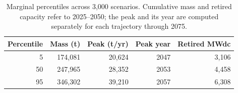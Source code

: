 \begin{table}[htbp]\centering\small
\caption{Marginal percentiles across 3,000 scenarios. Cumulative mass and retired capacity refer to 2025--2050; the peak and its year are computed separately for each trajectory through 2075.}\label{tab:mc}
\begin{tabular}{rrrrr}\toprule
Percentile & Mass (t) & Peak (t/yr) & Peak year & Retired MWdc \\
\midrule
5 & 174,081 & 20,624 & 2047 & 3,106 \\
50 & 247,965 & 28,352 & 2053 & 4,458 \\
95 & 346,302 & 39,210 & 2057 & 6,308 \\
\bottomrule\end{tabular}\end{table}
